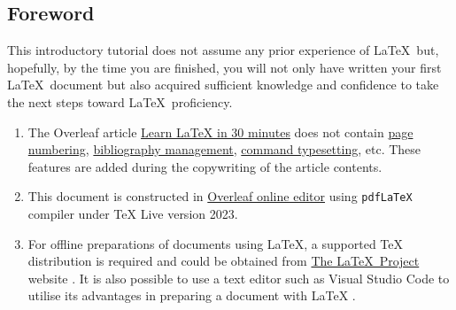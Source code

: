 \begin{center}
\section*{Foreword}
\end{center}

This introductory tutorial does not assume any prior experience of \LaTeX\ but, hopefully, by the time you are finished, you will not only have written your first \LaTeX\ document but also acquired sufficient knowledge and confidence to take the next steps toward \LaTeX\ proficiency.

\begin{enumerate}[label=\textit{\underline{Note \arabic*:}}]  
    \item The Overleaf article \href{https://www.overleaf.com/learn/latex/Learn_LaTeX_in_30_minutes}{Learn LaTeX in 30 minutes} does not contain \href{https://www.overleaf.com/learn/latex/Page_numbering}{page numbering}, \href{https://www.overleaf.com/learn/latex/Bibliography_management_in_LaTeX}{bibliography management}, \href{https://www.overleaf.com/learn/latex/Questions/Using_%5Cverb_to_typeset_the_text_of_LaTeX_commands}{command typesetting}, etc. These features are added during the copywriting of the article contents.
    \item This document is constructed in \href{https://www.overleaf.com/}{Overleaf online editor} using \verb|pdfLaTeX| compiler under TeX Live version 2023.
    \item For offline preparations of documents using LaTeX, a supported TeX distribution is required and could be obtained from \href{https://www.latex-project.org/}{The \LaTeX\ Project} website \cite{The_LaTeX_Project_get}. It is also possible to use a text editor such as Visual Studio Code to utilise its advantages in preparing a document with LaTeX \cite{Lee_2023}.
\end{enumerate}